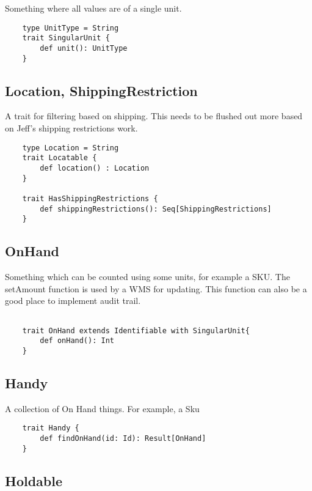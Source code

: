 \documentclass[11pt]{article}
\begin{document}
Something where all values are of a single unit.

\begin{lstlisting}
    type UnitType = String
    trait SingularUnit {
        def unit(): UnitType
    }
\end{lstlisting}

\subsection{Location, ShippingRestriction}

A trait for filtering based on shipping. This needs to be flushed out more based on
Jeff's shipping restrictions work.

\begin{lstlisting}
    type Location = String
    trait Locatable {
        def location() : Location
    }

    trait HasShippingRestrictions {
        def shippingRestrictions(): Seq[ShippingRestrictions]
    }

\end{lstlisting}

\subsection{OnHand}

Something which can be counted using some units, for example a SKU. 
The setAmount function is used by a WMS for updating. This function
can also be a good place to implement audit trail.

\begin{lstlisting}

    trait OnHand extends Identifiable with SingularUnit{ 
        def onHand(): Int
    }
\end{lstlisting}


\subsection{Handy}

A collection of On Hand things. For example, a Sku

\begin{lstlisting}
    trait Handy {
        def findOnHand(id: Id): Result[OnHand]
    }
\end{lstlisting}

\subsection{Holdable}
\end{document}
